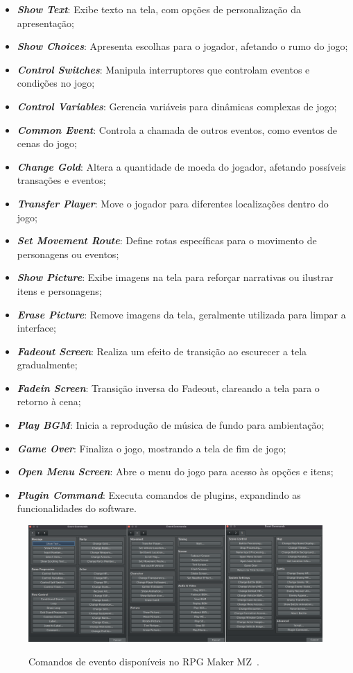 \begin{itemize}
	\item \textit{\textbf{Show Text}}: Exibe texto na tela, com opções de personalização da apresentação;
	\item \textit{\textbf{Show Choices}}: Apresenta escolhas para o jogador, afetando o rumo do jogo;
	\item \textit{\textbf{Control Switches}}: Manipula interruptores que controlam eventos e condições no jogo;
	\item \textit{\textbf{Control Variables}}: Gerencia variáveis para dinâmicas complexas de jogo;
	\item \textit{\textbf{Common Event}}: Controla a chamada de outros eventos, como eventos de cenas do jogo;
	\item \textit{\textbf{Change Gold}}: Altera a quantidade de moeda do jogador, afetando possíveis transações e eventos;
	\item \textit{\textbf{Transfer Player}}: Move o jogador para diferentes localizações dentro do jogo;
	\item \textit{\textbf{Set Movement Route}}: Define rotas específicas para o movimento de personagens ou eventos;
	\item \textit{\textbf{Show Picture}}: Exibe imagens na tela para reforçar narrativas ou ilustrar itens e personagens;
	\item \textit{\textbf{Erase Picture}}: Remove imagens da tela, geralmente utilizada para limpar a interface;
	\item \textit{\textbf{Fadeout Screen}}: Realiza um efeito de transição ao escurecer a tela gradualmente;
	\item \textit{\textbf{Fadein Screen}}: Transição inversa do Fadeout, clareando a tela para o retorno à cena;
	\item \textit{\textbf{Play BGM}}: Inicia a reprodução de música de fundo para ambientação;
	\item \textit{\textbf{Game Over}}: Finaliza o jogo, mostrando a tela de fim de jogo;
	\item \textit{\textbf{Open Menu Screen}}: Abre o menu do jogo para acesso às opções e itens;
	\item \textit{\textbf{Plugin Command}}: Executa comandos de plugins, expandindo as funcionalidades do software.
\end{itemize}

\begin{figure}[ht]
	\centering
	\caption{Comandos de evento disponíveis no RPG Maker MZ~\cite{RPGMakerMZ}.}
	\includegraphics[scale=0.25]{Textuais/Pictures/Event-commands.png}
	\label{fig:rpgmaker-event-commands}
\end{figure}

